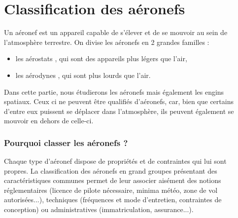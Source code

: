 
\section{Classification des aéronefs}
Un \gls{aéronef}  est un appareil capable de s'élever et de se mouvoir au sein de l'atmosphère terrestre. On divise les aéronefs en 2 grandes familles :
\begin{itemize}
	\item les  \gls{aérostat}s , qui sont des appareils plus légers que l'air,
	\item les  \gls{aérodyne}s , qui sont plus lourds que l'air.
\end{itemize}

Dans cette partie, nous étudierons les aéronefs mais également les engins spatiaux. Ceux ci ne peuvent être qualifiés d'aéronefs, car, bien que certains d'entre eux puissent se déplacer dans l'atmosphère, ils peuvent également se mouvoir en dehors de celle-ci.

\subsubsection{Pourquoi classer les aéronefs ?}
Chaque type d'aéronef dispose de propriétés et de contraintes qui lui sont propres. La classification des aéronefs en grand groupes présentant des caractéristiques communes permet de leur associer aisément des notions réglementaires (licence de pilote nécessaire, minima météo, zone de vol autorisées...), techniques (fréquences et mode d'entretien, contraintes de conception) ou administratives (immatriculation, assurance...).


